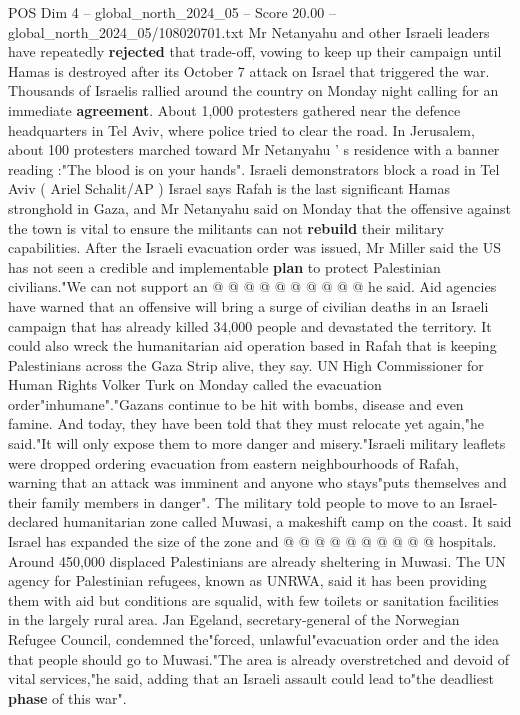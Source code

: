 \begin{textsample}{POS Dim 4 – global\_north\_2024\_05 – Score 20.00 – global\_north\_2024\_05/108020701.txt}
Mr Netanyahu and other Israeli leaders have repeatedly \textbf{rejected} that trade-off, vowing to keep up their campaign until Hamas is destroyed after its October 7 attack on Israel that triggered the war.
Thousands of Israelis rallied around the country on Monday night calling for an immediate \textbf{agreement}.
About 1,000 protesters gathered near the defence headquarters in Tel Aviv, where police tried to clear the road.
In Jerusalem, about 100 protesters marched toward Mr Netanyahu ' s residence with a banner reading :"The blood is on your hands".
Israeli demonstrators block a road in Tel Aviv ( Ariel Schalit/AP ) Israel says Rafah is the last significant Hamas stronghold in Gaza, and Mr Netanyahu said on Monday that the offensive against the town is vital to ensure the militants can not \textbf{rebuild} their military capabilities.
After the Israeli evacuation order was issued, Mr Miller said the US has not seen a credible and implementable \textbf{plan} to protect Palestinian civilians."We can not support an @ @ @ @ @ @ @ @ @ @ he said.
Aid agencies have warned that an offensive will bring a surge of civilian deaths in an Israeli campaign that has already killed 34,000 people and devastated the territory.
It could also wreck the humanitarian aid operation based in Rafah that is keeping Palestinians across the Gaza Strip alive, they say.
UN High Commissioner for Human Rights Volker Turk on Monday called the evacuation order"inhumane"."Gazans continue to be hit with bombs, disease and even famine.
And today, they have been told that they must relocate yet again,"he said."It will only expose them to more danger and misery."Israeli military leaflets were dropped ordering evacuation from eastern neighbourhoods of Rafah, warning that an attack was imminent and anyone who stays"puts themselves and their family members in danger".
The military told people to move to an Israel-declared humanitarian zone called Muwasi, a makeshift camp on the coast.
It said Israel has expanded the size of the zone and @ @ @ @ @ @ @ @ @ @ hospitals.
Around 450,000 displaced Palestinians are already sheltering in Muwasi.
The UN agency for Palestinian refugees, known as UNRWA, said it has been providing them with aid but conditions are squalid, with few toilets or sanitation facilities in the largely rural area.
Jan Egeland, secretary-general of the Norwegian Refugee Council, condemned the"forced, unlawful"evacuation order and the idea that people should go to Muwasi."The area is already overstretched and devoid of vital services,"he said, adding that an Israeli assault could lead to"the deadliest \textbf{phase} of this war".

\end{textsample}
